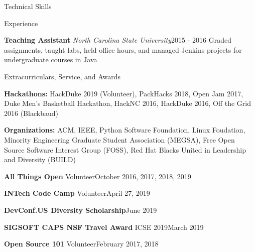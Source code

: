 \documentclass{resume} %
\begin{document}
\begin{rSection}{Technical Skills}
\begin{rSection}{Experience}
\begin{eSubsection}{\small \textbf{Teaching Assistant} \textit{North Carolina State University}}{\small 2015 - 2016}
{\small Graded assignments, taught labs, held office hours, and managed Jenkins projects for undergraduate courses in Java}
\end{eSubsection}
\vspace{-10pt}
\end{rSection}
\begin{rSection}{Extracurriculars, Service, and Awards}
\vspace{-5pt}
\begin{spacing}{0.25}
{\small \textbf{Hackathons:} HackDuke 2019 (Volunteer), PackHacks 2018, Open Jam 2017, Duke Men's Basketball Hackathon, HackNC 2016, HackDuke 2016, Off the Grid 2016 (Blackbaud)}
\end{spacing}
\vspace{5pt}
\begin{spacing}{0.25}
{\small \textbf{Organizations:} ACM, IEEE, Python Software Foundation, Linux Foudation, Minority Engineering Graduate Student Association (MEGSA), Free Open Source Software Interest Group (FOSS), Red Hat Blacks United in Leadership and Diversity (BUILD)}
\end{spacing}
\vspace{5pt}
\begin{sSubsection}
{\small \textbf{All Things Open} Volunteer}{October 2016, 2017, 2018, 2019} 
\end{sSubsection}
\vspace{-8pt}
\begin{sSubsection}
{\small \textbf{INTech Code Camp} Volunteer}{April 27, 2019} 
\end{sSubsection}
\vspace{-8pt}
\begin{sSubsection}
{\small \textbf{DevConf.US Diversity Scholarship}}{June 2019} 
\end{sSubsection}
\vspace{-8pt}
\begin{sSubsection}
{\small \textbf{SIGSOFT CAPS NSF Travel Award} ICSE 2019}{March 2019} 
\end{sSubsection}
\vspace{-8pt}
\begin{sSubsection}
{\small \textbf{Open Source 101} Volunteer}{February 2017, 2018} 
\end{sSubsection}




\end{rSection}
\end{rSection}
\end{document}
